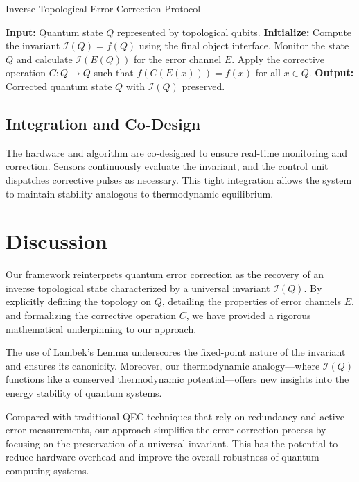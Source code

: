 \documentclass[11pt]{article}
\begin{document}
\begin{algorithm}[H]
\caption{Inverse Topological Error Correction Protocol}
\label{alg:itec}
\begin{algorithmic}[1]
\State \textbf{Input:} Quantum state \(Q\) represented by topological qubits.
\State \textbf{Initialize:} Compute the invariant \(\mathcal{I}(Q)=f(Q)\) using the final object interface.
\Repeat
    \State Monitor the state \(Q\) and calculate \(\mathcal{I}(E(Q))\) for the error channel \(E\).
        \State Apply the corrective operation \(C: Q\to Q\) such that \(f(C(E(x))) = f(x)\) for all \(x \in Q\).
    \EndIf
{}
\State \textbf{Output:} Corrected quantum state \(Q\) with \(\mathcal{I}(Q)\) preserved.
\end{algorithmic}
\end{algorithm}

\subsection{Integration and Co-Design}
The hardware and algorithm are co-designed to ensure real-time monitoring and correction. Sensors continuously evaluate the invariant, and the control unit dispatches corrective pulses as necessary. This tight integration allows the system to maintain stability analogous to thermodynamic equilibrium.

\section{Discussion}
\label{sec:discussion}
Our framework reinterprets quantum error correction as the recovery of an inverse topological state characterized by a universal invariant \(\mathcal{I}(Q)\). By explicitly defining the topology on \(Q\), detailing the properties of error channels \(E\), and formalizing the corrective operation \(C\), we have provided a rigorous mathematical underpinning to our approach.

The use of Lambek’s Lemma underscores the fixed-point nature of the invariant and ensures its canonicity. Moreover, our thermodynamic analogy—where \(\mathcal{I}(Q)\) functions like a conserved thermodynamic potential—offers new insights into the energy stability of quantum systems. 

Compared with traditional QEC techniques that rely on redundancy and active error measurements, our approach simplifies the error correction process by focusing on the preservation of a universal invariant. This has the potential to reduce hardware overhead and improve the overall robustness of quantum computing systems.
\end{document}
